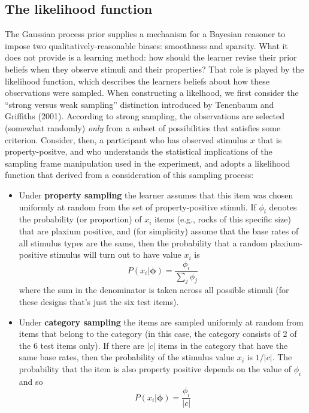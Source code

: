 \documentclass[
  english,
  doc]{apa6}
\begin{document}
\hypertarget{the-likelihood-function}{%
\subsection{The likelihood function}\label{the-likelihood-function}}

\noindent
The Gaussian process prior supplies a mechanism for a Bayesian reasoner to impose two qualitatively-reasonable biases: smoothness and sparsity. What it does not provide is a learning method: how should the learner revise their prior beliefs when they observe stimuli and their properties? That role is played by the likelihood function, which describes the learners beliefs about how these observations were sampled. When constructing a likelhood, we first consider the \enquote{strong versus weak sampling} distinction introduced by Tenenbaum and Griffiths (2001). According to strong sampling, the observations are selected (somewhat randomly) \emph{only} from a subset of possibilities that satisfies some criterion. Consider, then, a participant who has observed stimulus \(x\) that is property-positve, and who understands the statistical implications of the sampling frame manipulation used in the experiment, and adopts a likelihood function that derived from a consideration of this sampling process:

\begin{itemize}
\item
  Under \textbf{property sampling} the learner assumes that this item was chosen uniformly at random from the set of property-positive stimuli. If \(\phi_i\) denotes the probability (or proportion) of \(x_i\) items (e.g., rocks of this specific size) that are plaxium positive, and (for simplicity) assume that the base rates of all stimulus types are the same, then the probability that a random plaxium-positive stimulus will turn out to have value \(x_i\) is
  \[
  P(x_i | \bm{\phi}) = \frac{\phi_i}{\sum_j \phi_j}
  \]
  where the sum in the denominator is taken across all possible stimuli (for these designs that's just the six test items).
\item
  Under \textbf{category sampling} the items are sampled uniformly at random from items that belong to the category (in this case, the category consists of 2 of the 6 test items only). If there are \(|c|\) items in the category that have the same base rates, then the probability of the stimulus value \(x_i\) is \(1/|c|\). The probability that the item is also property positive depends on the value of \(\phi_i\) and so
  \[
  P(x_i | \bm{\phi}) = \frac{\phi_i}{|c|}
  \]
\end{itemize}
\end{document}
